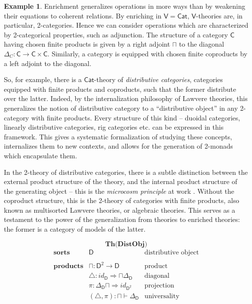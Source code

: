 \documentclass{amsart}
\theoremstyle{definition}
\newtheorem{example}[theorem]{Example}
\newcommand{\Cat}{\mathsf{Cat}}
\newcommand{\V}{\mathsf{V}}
\newcommand{\D}{\mathsf{D}}
\newcommand{\C}{\mathsf{C}}
\newcommand{\maps}{\colon}
\begin{document}
\begin{example}
  Enrichment generalizes operations in more ways than by weakening their equations to coherent relations. By enriching in $\V = \Cat$, $\V$-theories are, in particular, 2-categories. Hence we can consider operations which are characterized by 2-categorical properties, such as adjunction. The structure of a category $\C$ having chosen finite products is given by a right adjoint $\sqcap$ to the diagonal $\Delta_C\maps \C \to \C\times \C$. Similarly, a category is equipped with chosen finite coproducts by a left adjoint to the diagonal.

  So, for example, there is a $\Cat$-theory of \textit{distributive categories}, categories equipped with finite products and coproducts, such that the former distribute over the latter. Indeed, by the internalization philosophy of Lawvere theories, this generalizes the notion of distributive category to a ``distributive object'' in any 2-category with finite products. Every structure of this kind -- duoidal categories, linearly distributive categories, rig categories etc. can be expressed in this framework. This gives a systematic formalization of studying these concepts, internalizes them to new contexts, and allows for the generation of 2-monads which encapsulate them.

  In the 2-theory of distributive categories, there is a subtle distinction between the external product structure of the theory, and the internal product structure of the generating object -- this is the \textit{microcosm principle} at work \cite{}. Without the coproduct structure, this is the 2-theory of categories with finite products, also known as multisorted Lawvere theories, or algebraic theories. This serves as a testament to the power of the generalization from theories to enriched theories: the former is a category of models of the latter.\newpage

  \[ \textbf{Th(DistObj)} \]
	\[\begin{array}{lll}
            \textbf{sorts} & \D & \text{distributive object}\\\\
            
            \textbf{products} & \sqcap\maps \D^2 \to \D & \text{product}\\
                       & \bigtriangleup\maps id_\D \Longrightarrow \sqcap\Delta_\D & \text{diagonal}\\
                       & \pi\maps \Delta_\D\sqcap \Longrightarrow id_{\D^2} & \text{projection}\\
                           & (\bigtriangleup, \pi)\maps \sqcap \vdash \Delta_\D & \text{universality}\\\\


\end{array}\]
\end{example}
\end{document}
